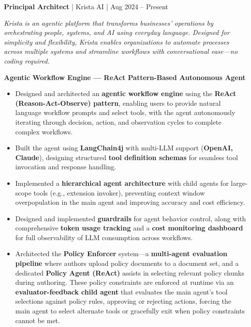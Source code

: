 \documentclass[a4paper,11pt]{article}
\newcommand{\jobtitle}[4]{
  \vspace{6pt}
  {\textbf{\textcolor{accent}{#1}} | #2 | #3}
  \vspace{2pt}
}
\begin{document}
\jobtitle{Principal Architect}{Krista AI}{Aug 2024 -- Present}{}

\textit{Krista is an agentic platform that transforms businesses' operations by orchestrating people, systems, and AI using everyday language. Designed for simplicity and flexibility, Krista enables organizations to automate processes across multiple systems and streamline workflows with conversational ease---no coding required.}

\vspace{4pt}
\textbf{Agentic Workflow Engine --- ReAct Pattern-Based Autonomous Agent}
\begin{itemize}[leftmargin=*, nosep]
  \item Designed and architected an \textbf{agentic workflow engine} using the \textbf{ReAct (Reason-Act-Observe) pattern}, enabling users to provide natural language workflow prompts and select tools, with the agent autonomously iterating through decision, action, and observation cycles to complete complex workflows.
  \item Built the agent using \textbf{LangChain4j} with multi-LLM support (\textbf{OpenAI, Claude}), designing structured \textbf{tool definition schemas} for seamless tool invocation and response handling.
  \item Implemented a \textbf{hierarchical agent architecture} with child agents for large-scope tools (e.g., extension invoker), preventing context window overpopulation in the main agent and improving accuracy and cost efficiency.
  \item Designed and implemented \textbf{guardrails} for agent behavior control, along with comprehensive \textbf{token usage tracking} and a \textbf{cost monitoring dashboard} for full observability of LLM consumption across workflows.
  \item Architected the \textbf{Policy Enforcer} system---a \textbf{multi-agent evaluation pipeline} where authors upload policy documents to a document set, and a dedicated \textbf{Policy Agent (ReAct)} assists in selecting relevant policy chunks during authoring. These policy constraints are enforced at runtime via an \textbf{evaluator-feedback child agent} that evaluates the main agent's tool selections against policy rules, approving or rejecting actions, forcing the main agent to select alternate tools or gracefully exit when policy constraints cannot be met.
\end{itemize}
\end{document}
